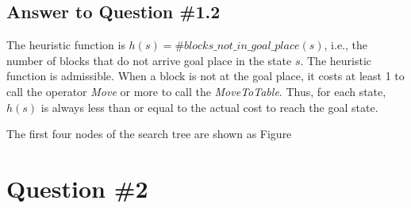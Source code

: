 \documentclass[conference]{styles/acmsiggraph}
\begin{document}
\subsection{Answer to Question \#1.2}

The heuristic function is $h(s) = \#blocks\_not\_in\_goal\_place (s)$, i.e., the number of blocks that do not arrive goal place in the state $s$. The heuristic function is admissible. When a block is not at the goal place, it costs at least 1 to call the operator \textit{Move} or more to call the \textit{MoveToTable}. Thus, for each state, $h(s)$ is always less than or equal to the actual cost to reach the goal state. 

The first four nodes of the search tree are shown as Figure



\section{Question \#2}
\end{document}
